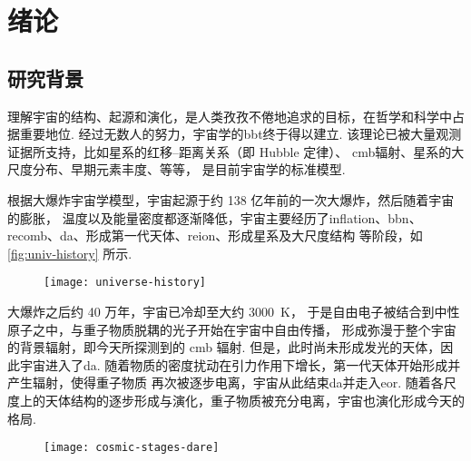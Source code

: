 
\chapter{绪论}
\label{chap:introduction}

\section{研究背景}
\label{sec:background}

理解宇宙的结构、起源和演化，是人类孜孜不倦地追求的目标，在哲学和科学中占据重要地位.
经过无数人的努力，宇宙学的\ac{bbt}终于得以建立.
该理论已被大量观测证据所支持，比如星系的红移--距离关系（即 Hubble 定律）、
\ac{cmb}辐射、星系的大尺度分布、早期元素丰度、等等，
是目前宇宙学的标准模型.

根据大爆炸宇宙学模型，宇宙起源于约 138 亿年前的一次大爆炸，然后随着宇宙的膨胀，
温度以及能量密度都逐渐降低，宇宙主要经历了\ac{inflation}、\ac{bbn}、
\ac{recomb}、\ac{da}、形成第一代天体、\ac{reion}、形成星系及大尺度结构
等阶段，如\autoref{fig:univ-history} 所示.

\begin{figure}[htp]
  \centering
  \texttt{[image: universe-history]}
  \label{fig:univ-history}
\end{figure}

大爆炸之后约 40 万年，宇宙已冷却至大约 \SI{3000}{\kelvin}，
于是自由电子被结合到中性原子之中，与重子物质脱耦的光子开始在宇宙中自由传播，
形成弥漫于整个宇宙的背景辐射，即今天所探测到的 \ac{cmb} 辐射.
但是，此时尚未形成发光的天体，因此宇宙进入了\ac{da}.
随着物质的密度扰动在引力作用下增长，第一代天体开始形成并产生辐射，使得重子物质
再次被逐步电离，宇宙从此结束\ac{da}并走入\ac{eor}.
随着各尺度上的天体结构的逐步形成与演化，重子物质被充分电离，宇宙也演化形成今天的格局.

\begin{figure}[htp]
  \centering
  \texttt{[image: cosmic-stages-dare]}
  \label{fig:cosmic-stages}
\end{figure}

